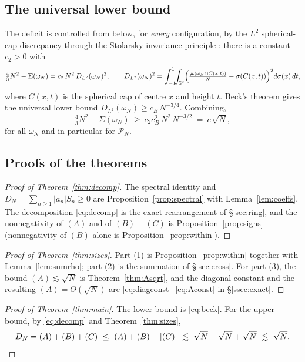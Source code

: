 \documentclass[11pt,reqno]{amsart}
\theoremstyle{definition}
\newcommand{\Sph}{\mathbb{S}^2}
\newcommand{\PN}{\mathcal{P}_N}
\newcommand{\abs}[1]{\lvert #1\rvert}
\newcommand{\Def}{D_N}
\newcommand{\lesss}{\lesssim}
\begin{document}
\subsection{The universal lower bound}
The deficit is controlled from below, for \emph{every} configuration, by the $L^2$ spherical-cap
discrepancy through the Stolarsky invariance principle \cite{Stolarsky,BilykDaiMatzke}: there is a
constant $c_2>0$ with
\begin{equation}\label{eq:stolarsky}
   \tfrac43N^2-\Sigma(\omega_N)=c_2\,N^2\,D_{L^2}(\omega_N)^2,
   \qquad
   D_{L^2}(\omega_N)^2=\int_{-1}^1\!\!\int_{\Sph}\Bigl(\tfrac{\#(\omega_N\cap C(x,t))}{N}-\sigma(C(x,t))\Bigr)^2 d\sigma(x)\,dt,
\end{equation}
where $C(x,t)$ is the spherical cap of centre $x$ and height $t$. Beck's theorem
\cite{BeckSphere} gives the universal lower bound $D_{L^2}(\omega_N)\ge c_B\,N^{-3/4}$. Combining,
\begin{equation}\label{eq:beck}
   \tfrac43N^2-\Sigma(\omega_N)\ \ge\ c_2c_B^2\,N^2\,N^{-3/2}\ =\ c\,\sqrt N ,
\end{equation}
for all $\omega_N$ and in particular for $\PN$.

\subsection{Proofs of the theorems}
\begin{proof}[Proof of Theorem~\ref{thm:decomp}]
The spectral identity and $\Def=\sum_{n\ge1}\abs{a_n}S_n\ge0$ are Proposition~\ref{prop:spectral}
with Lemma~\ref{lem:coeffs}. The decomposition \eqref{eq:decomp} is the exact rearrangement of
\S\ref{sec:ring}, and the nonnegativity of $(A)$ and of $(B)+(C)$ is Proposition~\ref{prop:signs}
(nonnegativity of $(B)$ alone is Proposition~\ref{prop:within}).
\end{proof}

\begin{proof}[Proof of Theorem~\ref{thm:sizes}]
Part (1) is Proposition~\ref{prop:within} together with Lemma~\ref{lem:sumrho}; part (2) is the
summation of \S\ref{sec:cross}. For part (3), the bound $(A)\lesssim\sqrt N$ is
Theorem~\ref{thm:Asqrt}, and the diagonal constant and the resulting $(A)=\Theta(\sqrt N)$ are
\eqref{eq:diagconst}--\eqref{eq:Aconst} in \S\ref{ssec:exact}.
\end{proof}

\begin{proof}[Proof of Theorem~\ref{thm:main}]
The lower bound is \eqref{eq:beck}. For the upper bound, by \eqref{eq:decomp} and
Theorem~\ref{thm:sizes},
\[
   \Def=(A)+(B)+(C)\ \le\ (A)+(B)+\abs{(C)}\ \lesss\ \sqrt N+\sqrt N+\sqrt N\ \lesss\ \sqrt N. \qedhere
\]
\end{proof}
\end{document}
